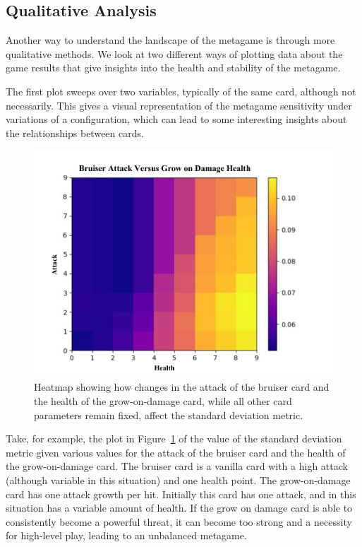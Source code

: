 \documentclass[letterpaper]{article} %
\begin{document}
\subsection{Qualitative Analysis} \label{sec:qualitative-analysis}

Another way to understand the landscape of the metagame is through more qualitative methods. We look at two different ways of plotting data about the game results that give insights into the health and stability of the metagame. 

The first plot sweeps over two variables, typically of the same card, although not necessarily. This gives a visual representation of the metagame sensitivity under variations of a configuration, which can lead to some interesting insights about the relationships between cards.

\begin{figure}[t]
        \centering
	\includegraphics[scale=0.5]{bruiser_vs_grow} 
	\caption{Heatmap showing how changes in the attack of the bruiser card and the health of the grow-on-damage card, while all other card parameters remain fixed, affect the standard deviation metric.}
	\label{fig:bruiser_vs_grow}
\end{figure}

Take, for example, the plot in Figure~\ref{fig:bruiser_vs_grow} of the value of the standard deviation metric given various values for the attack of the bruiser card and the health of the grow-on-damage card. The bruiser card is a vanilla card with a high attack (although variable in this situation) and one health point. The grow-on-damage card has one attack growth per hit. Initially this card has one attack, and in this situation has a variable amount of health. If the grow on damage card is able to consistently become a powerful threat, it can become too strong and a necessity for high-level play, leading to an unbalanced metagame.
\end{document}
